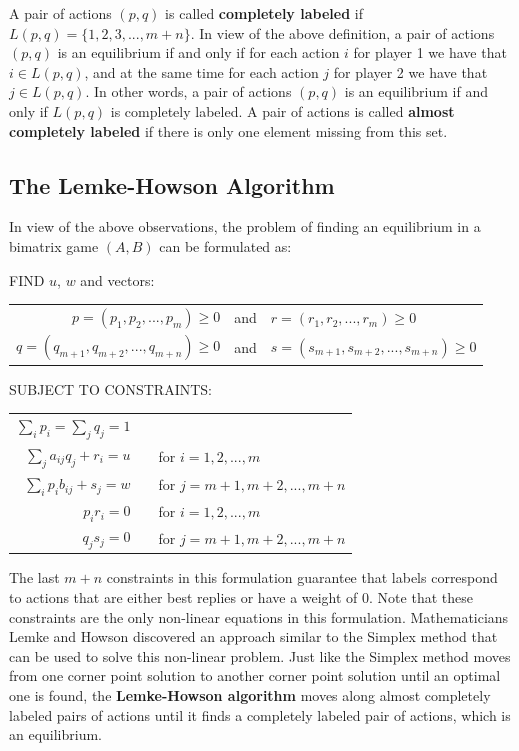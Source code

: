 \documentclass[12pt]{article}
\begin{document}
\noindent
A pair of actions $(p, q)$ is called \textbf{completely labeled} if $L(p, q) = \{ 1, 2, 3, ... , m + n \}$.
In view of the above definition, a pair of actions $(p, q)$ is an equilibrium if and only if for each action $i$ for player 1 we have that $i \in L(p, q)$, and at the same time for each action $j$ for player 2 we have that $j \in L(p, q)$.
In other words, a pair of actions $(p, q)$ is an equilibrium if and only if $L(p, q)$ is completely labeled.
A pair of actions is called \textbf{almost completely labeled} if there is only one element missing from this set.

\subsection{The Lemke-Howson Algorithm}
In view of the above observations, the problem of finding an equilibrium in a bimatrix game $(A, B)$ can be formulated as:

\newpage
\noindent
FIND $u$, $w$ and vectors:

\begin{table}[h]
    \centering
    \begin{tabular}{rcl}
    $p = (p_1, p_2, ... , p_m) \geq 0$ & \quad and \quad & $r = (r_1, r_2, ... , r_m) \geq 0$ \\
    $q = (q_{m + 1}, q_{m + 2}, ... , q_{m + n}) \geq 0$ & \quad and \quad & $s = (s_{m + 1}, s_{m + 2}, ... , s_{m + n}) \geq 0$
    \end{tabular}
\end{table}

\noindent
SUBJECT TO CONSTRAINTS:

\begin{table}[h]
    \centering
    \begin{tabular}{rcl}
        $\sum_i p_i = \sum_j q_j = 1$ & & \\
        $\sum_j a_{ij} q_j + r_i = u$ & \quad & for $i = 1, 2, ... , m$ \\
        $\sum_i p_i b_{ij} + s_j = w$ & \quad & for $j = m + 1, m + 2, ... , m + n$ \\
        $p_i r_i = 0$ & \quad & for $i = 1, 2, ... , m$ \\
        $q_j s_j = 0$ & \quad & for $j = m + 1, m + 2, ... , m + n$
    \end{tabular}
\end{table}

\noindent
The last $m + n$ constraints in this formulation guarantee that labels correspond to actions that are either best replies or have a weight of 0.
Note that these constraints are the only non-linear equations in this formulation.
Mathematicians Lemke and Howson discovered an approach similar to the Simplex method that can be used to solve this non-linear problem.
Just like the Simplex method moves from one corner point solution to another corner point solution until an optimal one is found, the \textbf{Lemke-Howson algorithm} moves along almost completely labeled pairs of actions until it finds a completely labeled pair of actions, which is an equilibrium.
\end{document}
